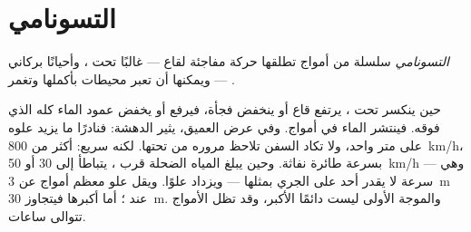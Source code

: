 \section{التسونامي}

\begin{definition}[التسونامي]\label{def:g7:earthquakes:tsunami}
\emph{التسونامي} سلسلة من أمواج  تطلقها حركة مفاجئة
لقاع  --- غالبًا  تحت ، وأحيانًا  بركاني --- ويمكنها
أن تعبر محيطات بأكملها وتغمر .
\end{definition}

حين ينكسر  تحت ، يرتفع قاع  أو ينخفض فجأة، فيرفع أو يخفض
عمود الماء كله الذي فوقه. فينتشر الماء في أمواج. وفي عرض  العميق،
يثير  الدهشة: فنادرًا ما يزيد علوه على متر واحد، ولا تكاد السفن
تلاحظ مروره من تحتها. لكنه سريع: أكثر من \qty{800}{km/h}، بسرعة طائرة
نفاثة. وحين يبلغ المياه الضحلة قرب ، يتباطأ إلى 30 أو
\qty{50}{km/h} --- وهي سرعة لا يقدر أحد على الجري بمثلها --- ويزداد علوًا.
ويقل علو معظم أمواج  عن \qty{3}{m} عند ؛ أما أكبرها فيتجاوز
\qty{30}{m}. والموجة الأولى ليست دائمًا الأكبر، وقد تظل الأمواج تتوالى
ساعات.


